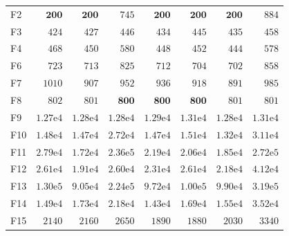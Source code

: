 \begin{tabular}{lrrrrrrr}
F2 & $\mathbf{200}$ & $\mathbf{200}$ & $745$ & $\mathbf{200}$ & $\mathbf{200}$ & $\mathbf{200}$ & $884$ \\
F3 & $424$ & $427$ & $446$ & $434$ & $445$ & $435$ & $458$ \\
F4 & $468$ & $450$ & $580$ & $448$ & $452$ & $444$ & $578$ \\
F6 & $723$ & $713$ & $825$ & $712$ & $704$ & $702$ & $858$ \\
F7 & $1010$ & $907$ & $952$ & $936$ & $918$ & $891$ & $985$ \\
F8 & $802$ & $801$ & $\mathbf{800}$ & $\mathbf{800}$ & $\mathbf{800}$ & $801$ & $801$ \\
F9 & $1.27\mathrm{e}{4}$ & $1.28\mathrm{e}{4}$ & $1.28\mathrm{e}{4}$ & $1.29\mathrm{e}{4}$ & $1.31\mathrm{e}{4}$ & $1.28\mathrm{e}{4}$ & $1.31\mathrm{e}{4}$ \\
F10 & $1.48\mathrm{e}{4}$ & $1.47\mathrm{e}{4}$ & $2.72\mathrm{e}{4}$ & $1.47\mathrm{e}{4}$ & $1.51\mathrm{e}{4}$ & $1.32\mathrm{e}{4}$ & $3.11\mathrm{e}{4}$ \\
F11 & $2.79\mathrm{e}{4}$ & $1.72\mathrm{e}{4}$ & $2.36\mathrm{e}{5}$ & $2.19\mathrm{e}{4}$ & $2.06\mathrm{e}{4}$ & $1.85\mathrm{e}{4}$ & $2.72\mathrm{e}{5}$ \\
F12 & $2.61\mathrm{e}{4}$ & $1.91\mathrm{e}{4}$ & $2.60\mathrm{e}{4}$ & $2.31\mathrm{e}{4}$ & $2.61\mathrm{e}{4}$ & $2.18\mathrm{e}{4}$ & $4.12\mathrm{e}{4}$ \\
F13 & $1.30\mathrm{e}{5}$ & $9.05\mathrm{e}{4}$ & $2.24\mathrm{e}{5}$ & $9.72\mathrm{e}{4}$ & $1.00\mathrm{e}{5}$ & $9.90\mathrm{e}{4}$ & $3.19\mathrm{e}{5}$ \\
F14 & $1.49\mathrm{e}{4}$ & $1.73\mathrm{e}{4}$ & $2.18\mathrm{e}{4}$ & $1.43\mathrm{e}{4}$ & $1.69\mathrm{e}{4}$ & $1.55\mathrm{e}{4}$ & $3.52\mathrm{e}{4}$ \\
F15 & $2140$ & $2160$ & $2650$ & $1890$ & $1880$ & $2030$ & $3340$ \\
\bottomrule
\end{tabular}
